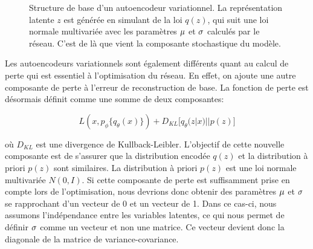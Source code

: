 \begin{figure}[h]
	\caption{Structure de base d'un autoencodeur variationnel. La représentation latente $z$ est générée en simulant de la loi $q(z)$,  qui suit une loi normale multivariée avec les paramètres $\boldmath \mu$ et $\boldmath \sigma$ calculés par le réseau. C'est de là que vient la composante stochastique du modèle.}
	\label{fig:VAEstructure}
\end{figure}

Les autoencodeurs variationnels sont également différents quant au calcul de perte qui est essentiel à l'optimisation du réseau. En effet, on ajoute une autre composante de perte à l'erreur de reconstruction de base. La fonction de perte est désormais définit comme une somme de deux composantes:

$$
L(x, p_\phi\{q_\theta(x)\}) + D_{KL}\big[q_\theta(z|x) || p(z)\big]
$$

où $D_{KL}$ est une divergence de Kullback-Leibler. L'objectif de cette nouvelle composante est de s'assurer que la distribution encodée $q(z)$ et la distribution à priori $p(z)$ sont similaires. La distribution à priori $p(z)$ est une loi normale multivariée $N(0, I)$. Si cette composante de perte est suffisamment prise en compte lors de l'optimisation, nous devrions donc obtenir des paramètres $\boldmath \mu$ et $\boldmath \sigma$ se rapprochant d'un vecteur de 0 et un vecteur de 1. Dans ce cas-ci, nous assumons l'indépendance entre les variables latentes, ce qui nous permet de définir $\boldmath \sigma$ comme un vecteur et non une matrice. Ce vecteur devient donc la diagonale de la matrice de variance-covariance.


